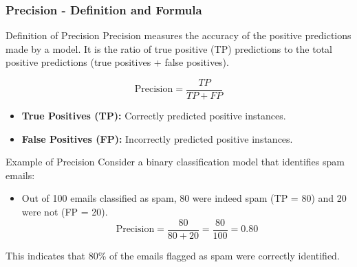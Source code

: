 \documentclass[aspectratio=169]{beamer}
\begin{document}
\begin{frame}[fragile]
    \frametitle{Precision - Definition and Formula}
    \begin{block}{Definition of Precision}
        Precision measures the accuracy of the positive predictions made by a model. It is the ratio of true positive (TP) predictions to the total positive predictions (true positives + false positives).
    \end{block}
    
    \begin{equation}
        \text{Precision} = \frac{TP}{TP + FP}
    \end{equation}

    \begin{itemize}
        \item \textbf{True Positives (TP):} Correctly predicted positive instances.
        \item \textbf{False Positives (FP):} Incorrectly predicted positive instances.
    \end{itemize}

    \begin{block}{Example of Precision}
        Consider a binary classification model that identifies spam emails: 
        \begin{itemize}
            \item Out of 100 emails classified as spam, 80 were indeed spam (TP = 80) and 20 were not (FP = 20).
            \begin{equation}
                \text{Precision} = \frac{80}{80 + 20} = \frac{80}{100} = 0.80
            \end{equation}
        \end{itemize}
        This indicates that 80\% of the emails flagged as spam were correctly identified.
    \end{block}
\end{frame}
\end{document}
